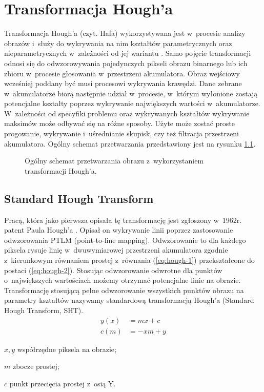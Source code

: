 \chapter{Transformacja Hough'a}
\label{sec:hough}

Transformacja Hough'a (czyt. Hafa) wykorzystywana jest w~procesie analizy obrazów i~służy do wykrywania na nim kształtów parametrycznych oraz nieparametrycznych w~zależności od jej wariantu \cite{mukhopadhyay2015survey}. Samo pojęcie transformacji odnosi się do odwzorowywania pojedynczych pikseli obrazu binarnego lub ich zbioru w~procesie głosowania w~przestrzeni akumulatora. Obraz wejściowy wcześniej poddany być musi procesowi wykrywania krawędzi. Dane zebrane w~akumulatorze biorą następnie udział w~procesie, w~którym wyłonione zostają potencjalne kształty poprzez wykrywanie największych wartości w~akumulatorze. W~zależności od specyfiki problemu oraz wykrywanych kształtów wykrywanie maksimów może odbywać się na różne sposoby. Użyte może zostać proste progowanie, wykrywanie i~uśrednianie skupisk, czy też filtracja przestrzeni akumulatora. Ogólny schemat przetwarzania przedstawiony jest na rysunku \ref{fig:hough}.

\begin{figure}
    \centering
    
    \caption{Ogólny schemat przetwarzania obrazu z~wykorzystaniem transformacji Hough'a.}
    \label{fig:hough}
\end{figure}

\section{Standard Hough Transform}

Pracą, która jako pierwsza opisała tę transformację jest zgłoszony w~1962r. patent Paula Hough'a \cite{hough1962method}. Opisał on wykrywanie linii poprzez zastosowanie odwzorowania PTLM (point-to-line mapping). Odwzorowanie to dla każdego piksela rysuje linię w~dwuwymiarowej przestrzeni akumulatora zgodnie z~kierunkowym równaniem prostej z~równania (\ref{eq:hough-1}) przekształcone do postaci (\ref{eq:hough-2}). Stosując odwzorowanie odwrotne dla punktów o~największych wartościach możemy otrzymać potencjalne linie na obrazie. Transformację stosującą pełne odwzorowanie wszystkich punktów obrazu na parametry kształtów nazywamy standardową transformacją Hough'a (Standard Hough Transform, SHT).
\begin{align}
    y(x) &= mx+c \label{eq:hough-1}\\
    c(m) &= -xm+y \label{eq:hough-2}
\end{align}
\begin{eqexpl}
    \item{$x, y$} współrzędne piksela na obrazie;
    \item{$m$} zbocze prostej;
    \item{$c$} punkt przecięcia prostej z~osią Y.
\end{eqexpl}


